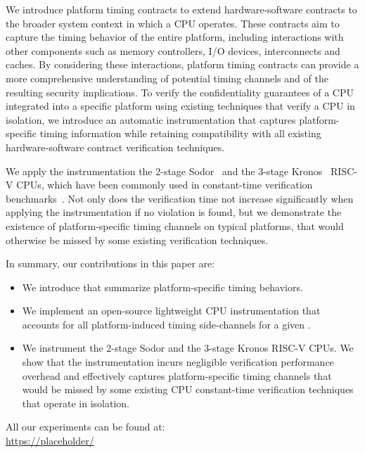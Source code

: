 We introduce platform timing contracts to extend hardware-software contracts to the broader system context in which a CPU operates.
% 
These contracts aim to capture the timing behavior of the entire platform, including interactions with other components such as memory controllers, I/O devices, interconnects and caches.
By considering these interactions, platform timing contracts can provide a more comprehensive understanding of potential timing channels and of the resulting security implications.
To verify the confidentiality guarantees of a CPU integrated into a specific platform using existing techniques that verify a CPU in isolation, we introduce an automatic instrumentation that captures platform-specific timing information while retaining compatibility with all existing hardware-software contract verification techniques.

We apply the instrumentation the 2-stage Sodor~\cite{sodor} and the 3-stage Kronos~\cite{kronos} RISC-V CPUs, which have been commonly used in constant-time verification benchmarks~\cite{wang2023specification,tan2025contractshadowlogic,ceesay2024mucfi}.
Not only does the verification time not increase significantly when applying the instrumentation if no violation is found, but we demonstrate the existence of platform-specific timing channels on typical platforms, that would otherwise be missed by some existing verification techniques.

In summary, our contributions in this paper are:
\begin{itemize}
    \item We introduce \pics that summarize platform-specific timing behaviors.
    
    \item We implement an open-source lightweight CPU instrumentation that accounts for all platform-induced timing side-channels for a given \pic.
    
    \item We instrument the 2-stage Sodor and the 3-stage Kronos RISC-V CPUs. We show that the instrumentation incurs negligible verification performance overhead and effectively captures platform-specific timing channels that would be missed by some existing CPU constant-time verification techniques that operate in isolation.
\end{itemize}

All our experiments can be found at: \\
\url{https://placeholder/} 
